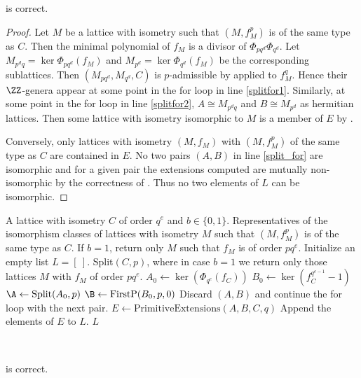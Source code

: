 \begin{lemma}
  is correct.
\end{lemma}
\begin{proof}
Let $M$ be a lattice with isometry such that $(M,f^p_M)$ is of the same type as $C$. Then the minimal polynomial of $f_M$ is a divisor of
$\Phi_{pq^d}\Phi_{q^d}$. Let $M_{p^dq}=\ker \Phi_{pq^d}(f_M)$ and $M_{p^d}=\ker \Phi_{q^d}(f_M)$ be the corresponding sublattices. Then $(M_{pq^d},M_{q^d},C)$ is $p$-admissible by  applied to $f_M^q$.
Hence their $\ZZ$-genera appear at some point in the for loop in line \ref{splitfor1}.
Similarly, at some point in the for loop in line \ref{splitfor2}, $A \cong M_{p^dq}$ and $B\cong M_{p^d}$ as hermitian lattices. Then some lattice with isometry isomorphic to $M$ is a member of $E$ by .

  Conversely, only lattices with isometry $(M,f_M)$ with $(M,f_M^p)$ of the same type as $C$ are contained in $E$.
No two pairs $(A,B)$ in line \ref{split_for} are isomorphic and for a given pair the extensions computed  are mutually non-isomorphic by the correctness of .
Thus no two elements of $L$ can be isomorphic.
\end{proof}


\begingroup
{}\label{FirstP}
\endgroup
\begin{algorithmic}[1]
\REQUIRE A lattice with isometry $C$ of order $q^e$ and $b \in \{0,1\}$.
  \ENSURE Representatives of the isomorphism classes of lattices with isometry $M$ such that $(M,f_M^p)$ is of the same type as $C$. If $b=1$, return only $M$ such that $f_M$ is of order $pq^e$.
\STATE Initialize an empty list $L = [\ ]$.
\RETURN Split$(C, p)$, where in case $b = 1$ we return only those lattices $M$ with $f_M$ of order $pq^e$. \label{firstp_e0}
\ENDIF
\STATE $A_0 \gets \ker(\Phi_{q^e}(f_C))$ \label{firstp1}
\STATE $B_0 \gets \ker(f_C^{q^{e-1}}-1)$ \label{firstp2}
\STATE $\A \gets  \mbox{Split}(A_0, p)$
  \STATE $\B \gets  \mbox{FirstP}(B_0,p, 0)$
 \label{firstpAB}
        \STATE Discard $(A,B)$ and continue the for loop with the next pair.
    \ENDIF
    \STATE $E \gets \mbox{PrimitiveExtensions}(A,B,C,q)$
    \STATE Append the elements of $E$ to $L$.
\ENDFOR
\RETURN $L$
\end{algorithmic}\hrulefill\\

\begin{lemma}
  is correct.
\end{lemma}

